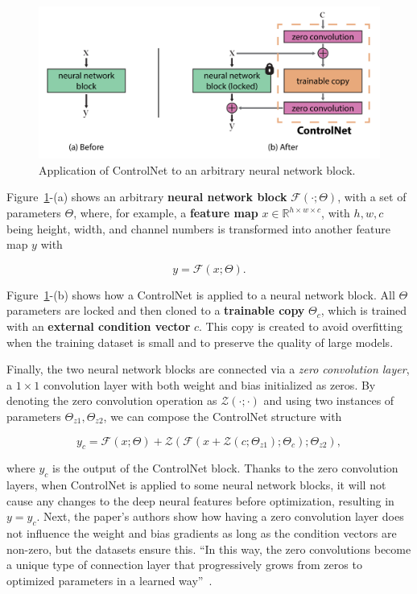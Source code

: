 \documentclass[sn-mathphys,Numbered]{sn-jnl}
\theoremstyle{thmstyleone}%
\theoremstyle{thmstyletwo}%
\theoremstyle{thmstylethree}%
\begin{document}
\begin{figure}[b]
	\centering
    \includegraphics[scale=0.8]{img/svg/Controlnet1.png}
	\caption{Application of ControlNet to an arbitrary neural network block.}\label{fig:controlnet}
\end{figure}


Figure~\ref{fig:controlnet}-(a) shows an arbitrary \textbf{neural network block} $\mathcal{F}(\cdot;\Theta)$,  with a set of parameters $\Theta$, where, for example, a \textbf{feature map} $x \in \mathbb{R}^{h\times w \times c}$, with ${h,w,c}$  being height, width, and channel numbers is transformed into another feature map $y$ with

\begin{equation}
	y = \mathcal{F}(x;\Theta).
\end{equation}

Figure~\ref{fig:controlnet}-(b) shows how a ControlNet is applied to a neural network block.
All $\Theta$ parameters are locked and then cloned to a \textbf{trainable copy} $\Theta_c$, 
which is trained with an \textbf{external condition vector} $c$.  This copy is created to avoid overfitting when the training dataset is small  and to preserve the quality of large models. 

Finally, the two neural network blocks are connected via a \emph{zero convolution layer},  a $1\times1$ convolution layer with both weight and bias initialized as zeros. By denoting the zero convolution operation as $\mathcal{Z}(\cdot;\cdot)$ and using two instances of parameters ${\Theta_{z1},\Theta_{z2}}$, we can compose the ControlNet structure with

\begin{equation}
	y_c = \mathcal{F}(x;\Theta) + \mathcal{Z}(\mathcal{F}(x+\mathcal{Z}(c;\Theta_{z1});\Theta_c);\Theta_{z2}),
\end{equation}

\noindent where $y_c$ is the output of the ControlNet block. Thanks to the zero convolution layers, when ControlNet is applied to some neural network blocks,  it will not cause any changes to the deep neural features before optimization, resulting in $y=y_c$.
Next, the paper's authors show how having a zero convolution layer does not influence the weight 
and bias gradients as long as the condition vectors are non-zero, but the datasets ensure this.
``In this way, the zero convolutions become a unique type of connection layer that progressively grows from zeros to
optimized parameters in a learned way''~\cite{zhang2023adding}.
\end{document}
